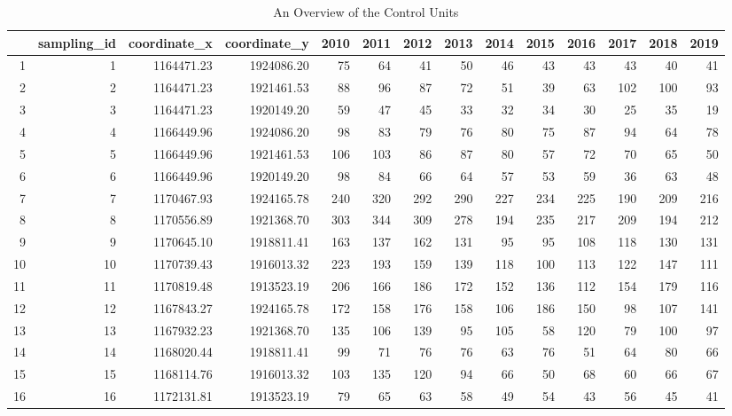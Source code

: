 \documentclass[a4paper, 11pt]{article}
\begin{document}
\begin{landscape}
\begin{table}[ht]
\centering
  \caption{An Overview of the Control Units} 
  \label{tab:control} 
\begin{tabular}{rrrrrrrrrrrrrr}
  \hline\hline
 & sampling\_id & coordinate\_x & coordinate\_y & 2010 & 2011 & 2012 & 2013 & 2014 & 2015 & 2016 & 2017 & 2018 & 2019 \\ 
  \hline
1 &   1 & 1164471.23 & 1924086.20 &  75 &  64 &  41 &  50 &  46 &  43 &  43 &  43 &  40 &  41 \\ 
  2 &   2 & 1164471.23 & 1921461.53 &  88 &  96 &  87 &  72 &  51 &  39 &  63 & 102 & 100 &  93 \\ 
  3 &   3 & 1164471.23 & 1920149.20 &  59 &  47 &  45 &  33 &  32 &  34 &  30 &  25 &  35 &  19 \\ 
  4 &   4 & 1166449.96 & 1924086.20 &  98 &  83 &  79 &  76 &  80 &  75 &  87 &  94 &  64 &  78 \\ 
  5 &   5 & 1166449.96 & 1921461.53 & 106 & 103 &  86 &  87 &  80 &  57 &  72 &  70 &  65 &  50 \\ 
  6 &   6 & 1166449.96 & 1920149.20 &  98 &  84 &  66 &  64 &  57 &  53 &  59 &  36 &  63 &  48 \\ 
  7 &   7 & 1170467.93 & 1924165.78 & 240 & 320 & 292 & 290 & 227 & 234 & 225 & 190 & 209 & 216 \\ 
  8 &   8 & 1170556.89 & 1921368.70 & 303 & 344 & 309 & 278 & 194 & 235 & 217 & 209 & 194 & 212 \\ 
  9 &   9 & 1170645.10 & 1918811.41 & 163 & 137 & 162 & 131 &  95 &  95 & 108 & 118 & 130 & 131 \\ 
  10 &  10 & 1170739.43 & 1916013.32 & 223 & 193 & 159 & 139 & 118 & 100 & 113 & 122 & 147 & 111 \\ 
  11 &  11 & 1170819.48 & 1913523.19 & 206 & 166 & 186 & 172 & 152 & 136 & 112 & 154 & 179 & 116 \\ 
  12 &  12 & 1167843.27 & 1924165.78 & 172 & 158 & 176 & 158 & 106 & 186 & 150 &  98 & 107 & 141 \\ 
  13 &  13 & 1167932.23 & 1921368.70 & 135 & 106 & 139 &  95 & 105 &  58 & 120 &  79 & 100 &  97 \\ 
  14 &  14 & 1168020.44 & 1918811.41 &  99 &  71 &  76 &  76 &  63 &  76 &  51 &  64 &  80 &  66 \\ 
  15 &  15 & 1168114.76 & 1916013.32 & 103 & 135 & 120 &  94 &  66 &  50 &  68 &  60 &  66 &  67 \\ 
  16 &  16 & 1172131.81 & 1913523.19 &  79 &  65 &  63 &  58 &  49 &  54 &  43 &  56 &  45 &  41 \\ 
   \hline\hline
\end{tabular}
\end{table}

\end{landscape}
\end{document}
